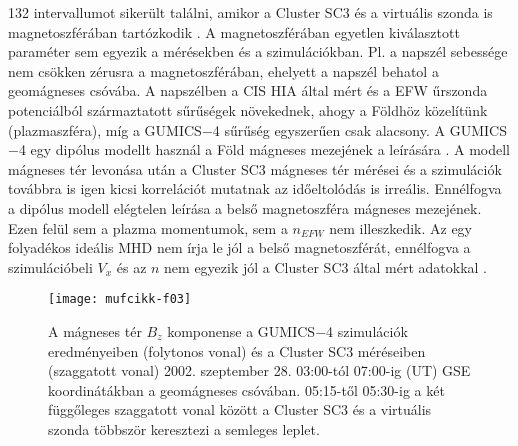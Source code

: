 \documentclass[b5paper,10pt]{article}
\begin{document}
132 intervallumot sikerült találni, amikor a Cluster SC3 és a virtuális szonda is magnetoszférában tartózkodik \cite{facsko21:_compar_gumic_terres_magnet_clust_measur}. A magnetoszférában egyetlen kiválasztott paraméter sem egyezik a mérésekben és a szimulációkban. Pl. a napszél sebessége nem csökken zérusra a magnetoszférában, ehelyett a napszél behatol a geomágneses csóvába. A napszélben a CIS HIA által mért és a EFW űrszonda potenciálból származtatott sűrűségek növekednek, ahogy a Földhöz közelítünk (plazmaszféra), míg a GUMICS$-$4 sűrűség egyszerűen csak alacsony. A GUMICS$-$4 egy dipólus modellt használ a Föld mágneses mezejének a leírására \cite{janhunen12:_gumic_mhd}. A modell mágneses tér levonása után a Cluster SC3 mágneses tér mérései és a szimulációk továbbra is igen kicsi korrelációt mutatnak az időeltolódás is irreális. Ennélfogva a dipólus modell elégtelen leírása a belső magnetoszféra mágneses mezejének. Ezen felül sem a plazma momentumok, sem a $n_{EFW}$ nem illeszkedik. Az egy folyadékos ideális MHD nem írja le jól a belső magnetoszférát, ennélfogva a szimulációbeli $V_{x}$ és az $n$ nem egyezik jól a Cluster SC3 által mért adatokkal \cite{facsko21:_compar_gumic_terres_magnet_clust_measur}.

\begin{figure}[t]
\centering
\texttt{[image: mufcikk-f03]} 
\caption{A mágneses tér $B_{z}$ komponense a GUMICS$-$4 szimulációk eredményeiben (folytonos vonal) és a Cluster SC3 méréseiben (szaggatott vonal) 2002. szeptember 28. 03:00-tól 07:00-ig (UT) GSE koordinátákban a geomágneses csóvában. 05:15-től 05:30-ig a két függőleges szaggatott vonal között a Cluster SC3 és a virtuális szonda többször keresztezi a semleges leplet.}
\label{fig:nsplot}
\end{figure}
\end{document}
